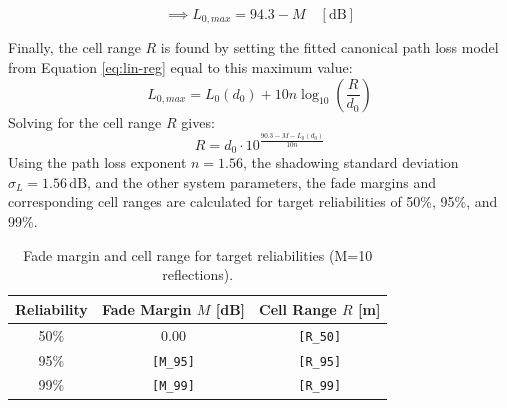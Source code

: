\begin{equation}
	\implies \boxed{L_{0,max} = 94.3 - M} \quad [\text{dB}]
\end{equation}

Finally, the cell range $R$ is found by setting the fitted canonical path loss model from Equation \eqref{eq:lin-reg} equal to this maximum value:
\begin{equation}
	L_{0,max} = L_0(d_0) + 10n \log_{10}\left(\frac{R}{d_0}\right)
\end{equation}
Solving for the cell range $R$ gives:
\begin{equation}
	\label{eq:cell_range_R}
	R = d_0 \cdot 10^{\frac{90.3 - M - L_0(d_0)}{10n}}
\end{equation}
Using the path loss exponent $n = 1.56$, the shadowing standard deviation $\sigma_L = 1.56\,\mathrm{dB}$, and the other system parameters, the fade margins and corresponding cell ranges are calculated for target reliabilities of 50\%, 95\%, and 99\%.

\begin{table}[h!]
	\centering
	\caption{Fade margin and cell range for target reliabilities (M=10 reflections).}
	\label{tab:fade_margin_range}
	\vspace{0.3em}
	\begin{tabular}{|c|c|c|}
		\hline
		{Reliability} & {Fade Margin $M$ [dB]} & {Cell Range $R$ [m]} \\
		\hline
		50\% & 0.00 & \texttt{[R\_50]} \\
		\hline
		95\% & \texttt{[M\_95]} & \texttt{[R\_95]} \\
		\hline
		99\% & \texttt{[M\_99]} & \texttt{[R\_99]} \\
		\hline
	\end{tabular}
\end{table}



